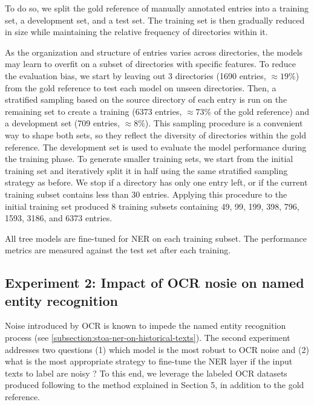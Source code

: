 To do so, we split the gold reference of manually annotated entries into a training set, a development set, and a test set. 
The training set is then gradually reduced in size while maintaining the relative frequency of directories within it.

As the organization and structure of entries varies across directories, the models may learn to overfit on a subset of directories with specific features.
To reduce the evaluation bias, we start by leaving out 3 directories (1690 entries, $\approx 19\%$) from the gold reference to test each model on unseen directories.
Then, a stratified sampling based on the source directory of each entry is run on the remaining set to create a training (6373 entries, $\approx 73\%$ of the gold reference) and a development set (709 entries, $\approx 8\%$).
This sampling procedure is a convenient way to shape both sets, so they reflect the diversity of directories within the gold reference.
The development set is used to evaluate the model performance during the training phase.
To generate smaller training sets, we start from the initial training set and iteratively split it in half using the same stratified sampling strategy as before.
We stop if a directory has only one entry left, or if the current training subset contains less than 30 entries.
Applying this procedure to the initial training set produced 8 training subsets containing 49, 99, 199, 398, 796, 1593, 3186, and 6373 entries.

All tree models are fine-tuned for NER on each training subset.
The performance metrics are measured against the test set after each training.




\subsection{Experiment 2: Impact of OCR nosie on named entity recognition}
\label{subsection:experiment-2-setup}
Noise introduced by OCR is known to impede the named entity recognition process (see \cref{subsection:stoa-ner-on-historical-texts}).
The second experiment addresses two questions (1) which model is the most robust to OCR noise and (2) what is the most appropriate strategy to fine-tune the NER layer if the input texts to label are noisy ?
To this end, we leverage the labeled OCR datasets produced following to the method explained in Section 5, in addition to the gold reference.

